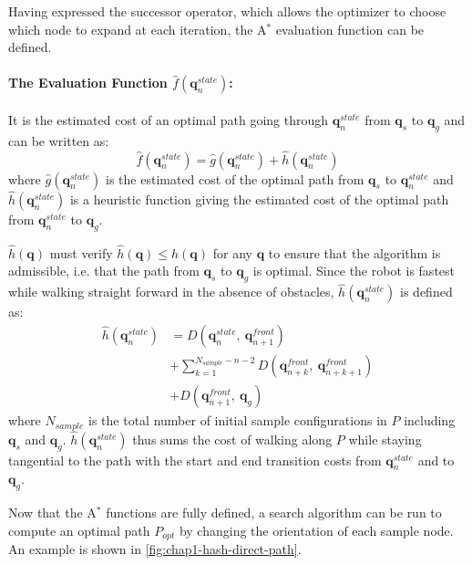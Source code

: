 Having expressed the successor operator, which allows the optimizer to
choose which node to expand at each iteration, the A$^{*}$ evaluation
function can be defined.

\paragraph{The Evaluation Function $\hat{f}(\mathbf{q}_n^{state})$:}
It is the estimated cost of an optimal path going through
$\mathbf{q}_n^{state}$ from $\mathbf{q}_s$ to $\mathbf{q}_g$ and can be written as:
\begin{equation}
  \hat{f}(\mathbf{q}_n^{state}) = \hat{g}(\mathbf{q}_n^{state}) +
  \hat{h}(\mathbf{q}_n^{state})
\end{equation}
where $\hat{g}(\mathbf{q}_n^{state})$ is the estimated cost of the
optimal path from $\mathbf{q}_s$ to $\mathbf{q}_n^{state}$ and
$\hat{h}(\mathbf{q}_n^{state})$ is a heuristic function giving the
estimated cost of the optimal path from $\mathbf{q}_n^{state}$ to
$\mathbf{q}_g$.

$\hat{h}(\mathbf{q})$ must verify $\hat{h}(\mathbf{q}) \leq
h(\mathbf{q})$ for any $\mathbf{q}$ to ensure that the algorithm is
admissible, i.e. that the path from $\mathbf{q}_s$ to $\mathbf{q}_g$
is optimal. Since the robot is fastest while walking straight forward
in the absence of obstacles, $\hat{h}(\mathbf{q}_n^{state})$ is
defined as:
\begin{equation}
  \begin{split}
  \hat{h}(\mathbf{q}_n^{state}) &= D(\mathbf{q}_n^{state},~\mathbf{q}_{n+1}^{front}) \\
  &+ \sum_{k=1}^{N_{sample}-n-2} D(\mathbf{q}_{n+k}^{front},~\mathbf{q}_{n+k+1}^{front}) \\
  &+ D(\mathbf{q}_{n+1}^{front},~\mathbf{q}_g)
  \end{split}
\end{equation}
where $N_{sample}$ is the total number of initial sample
configurations in $P$ including $\mathbf{q}_s$ and
$\mathbf{q}_g$. $\hat{h}(\mathbf{q}_n^{state})$ thus sums the cost of
walking along $P$ while staying tangential to the path with the start
and end transition costs from $\mathbf{q}_n^{state}$ and to
$\mathbf{q}_g$.

Now that the A$^{*}$ functions are fully defined, a search algorithm can be
run to compute an optimal path $P_{opt}$ by changing the orientation
of each sample node. An example is shown in
\autoref{fig:chap1-hash-direct-path}.

